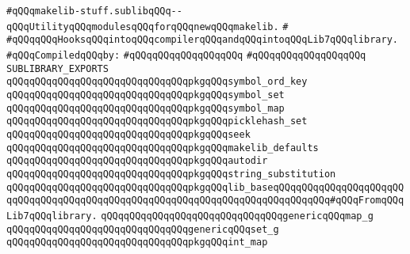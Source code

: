 \label{src/app/makelib/stuff/makelib-stuff.sublib}
\verb|#qQQqmakelib-stuff.sublibqQQq--qQQqUtilityqQQqmodulesqQQqforqQQqnewqQQqmakelib.|\newline
\verb|#|\newline
\verb|#qQQqqQQqHooksqQQqintoqQQqcompilerqQQqandqQQqintoqQQqLib7qQQqlibrary.|\newline
\newline
\verb|#qQQqCompiledqQQqby:|\newline
\verb|#qQQqqQQqqQQqqQQqqQQq|\newline
\verb|#qQQqqQQqqQQqqQQqqQQq|\newline
\newline
\verb|SUBLIBRARY_EXPORTS|\newline
\newline
\verb|qQQqqQQqqQQqqQQqqQQqqQQqqQQqqQQqpkgqQQqsymbol_ord_key|\newline
\verb|qQQqqQQqqQQqqQQqqQQqqQQqqQQqqQQqpkgqQQqsymbol_set|\newline
\verb|qQQqqQQqqQQqqQQqqQQqqQQqqQQqqQQqpkgqQQqsymbol_map|\newline
\verb|qQQqqQQqqQQqqQQqqQQqqQQqqQQqqQQqpkgqQQqpicklehash_set|\newline
\newline
\verb|qQQqqQQqqQQqqQQqqQQqqQQqqQQqqQQqpkgqQQqseek|\newline
\newline
\verb|qQQqqQQqqQQqqQQqqQQqqQQqqQQqqQQqpkgqQQqmakelib_defaults|\newline
\verb|qQQqqQQqqQQqqQQqqQQqqQQqqQQqqQQqpkgqQQqautodir|\newline
\newline
\verb|qQQqqQQqqQQqqQQqqQQqqQQqqQQqqQQqpkgqQQqstring_substitution|\newline
\newline
\verb|qQQqqQQqqQQqqQQqqQQqqQQqqQQqqQQqpkgqQQqlib_baseqQQqqQQqqQQqqQQqqQQqqQQqqQQqqQQqqQQqqQQqqQQqqQQqqQQqqQQqqQQqqQQqqQQqqQQqqQQqqQQq#qQQqFromqQQqLib7qQQqlibrary.|\newline
\newline
\verb|qQQqqQQqqQQqqQQqqQQqqQQqqQQqqQQqgenericqQQqmap_g|\newline
\verb|qQQqqQQqqQQqqQQqqQQqqQQqqQQqqQQqgenericqQQqset_g|\newline
\newline
\verb|qQQqqQQqqQQqqQQqqQQqqQQqqQQqqQQqpkgqQQqint_map|\newline
